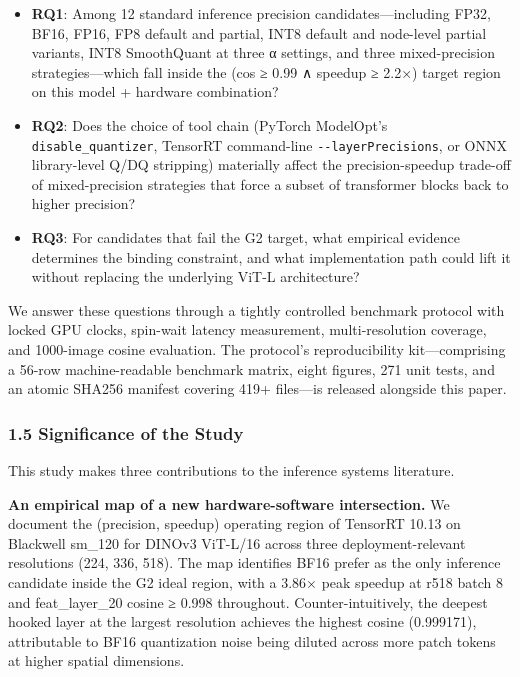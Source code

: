 \documentclass[
]{article}
\begin{document}
\begin{itemize}
\item
  \textbf{RQ1}: Among 12 standard inference precision
  candidates---including FP32, BF16, FP16, FP8 default and partial, INT8
  default and node-level partial variants, INT8 SmoothQuant at three α
  settings, and three mixed-precision strategies---which fall inside the
  (cos ≥ 0.99 ∧ speedup ≥ 2.2×) target region on this model + hardware
  combination?
\item
  \textbf{RQ2}: Does the choice of tool chain (PyTorch ModelOpt's
  \texttt{disable\_quantizer}, TensorRT command-line
  \texttt{-\/-layerPrecisions}, or ONNX library-level Q/DQ stripping)
  materially affect the precision-speedup trade-off of mixed-precision
  strategies that force a subset of transformer blocks back to higher
  precision?
\item
  \textbf{RQ3}: For candidates that fail the G2 target, what empirical
  evidence determines the binding constraint, and what implementation
  path could lift it without replacing the underlying ViT-L
  architecture?
\end{itemize}

We answer these questions through a tightly controlled benchmark
protocol with locked GPU clocks, spin-wait latency measurement,
multi-resolution coverage, and 1000-image cosine evaluation. The
protocol's reproducibility kit---comprising a 56-row machine-readable
benchmark matrix, eight figures, 271 unit tests, and an atomic SHA256
manifest covering 419+ files---is released alongside this paper.

\subsubsection{1.5 Significance of the
Study}\label{significance-of-the-study}

This study makes three contributions to the inference systems
literature.

\textbf{An empirical map of a new hardware-software intersection.} We
document the (precision, speedup) operating region of TensorRT 10.13 on
Blackwell sm\_120 for DINOv3 ViT-L/16 across three deployment-relevant
resolutions (224, 336, 518). The map identifies BF16 prefer as the only
inference candidate inside the G2 ideal region, with a 3.86× peak
speedup at r518 batch 8 and feat\_layer\_20 cosine ≥ 0.998 throughout.
Counter-intuitively, the deepest hooked layer at the largest resolution
achieves the highest cosine (0.999171), attributable to BF16
quantization noise being diluted across more patch tokens at higher
spatial dimensions.
\end{document}

